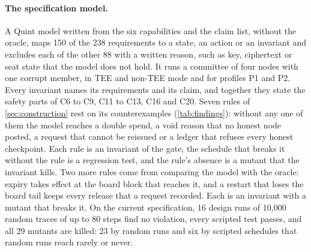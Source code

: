 \paragraph{The specification model.} A Quint model written from the six capabilities and the claim list, without the oracle, maps 150 of the 238 requirements to a state, an action or an invariant and excludes each of the other 88 with a written reason, such as key, ciphertext or seat state that the model does not hold. It runs a committee of four nodes with one corrupt member, in TEE and non-TEE mode and for profiles P1 and P2. Every invariant names its requirements and its claim, and together they state the safety parts of C6 to C9, C11 to C13, C16 and C20. Seven rules of \cref{sec:construction} rest on its counterexamples (\cref{tab:findings}): without any one of them the model reaches a double spend, a void reason that no honest node posted, a request that cannot be reissued or a ledger that refuses every honest checkpoint. Each rule is an invariant of the gate, the schedule that breaks it without the rule is a regression test, and the rule's absence is a mutant that the invariant kills. Two more rules come from comparing the model with the oracle: expiry takes effect at the board block that reaches it, and a restart that loses the board tail keeps every release that a request recorded. Each is an invariant with a mutant that breaks it. On the current specification, 16 design runs of 10{,}000 random traces of up to 80 steps find no violation, every scripted test passes, and all 29 mutants are killed: 23 by random runs and six by scripted schedules that random runs reach rarely or never.

